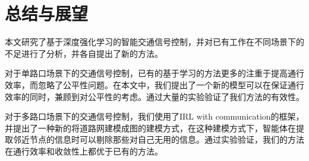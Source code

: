 \chapter{总结与展望}
本文研究了基于深度强化学习的智能交通信号控制，并对已有工作在不同场景下的不足进行了分析，并各自提出了新的方法。

对于单路口场景下的交通信号控制，已有的基于学习的方法更多的注重于提高通行效率，而忽略了公平性问题。在本文中，我们提出了一个新的模型可以在保证通行效率的同时，兼顾到对公平性的考虑。通过大量的实验验证了我们方法的有效性。

对于多路口场景下的交通信号控制，我们使用了IRL with communication的框架，并提出了一种新的将道路网建模成图的建模方式，在这种建模方式下，智能体在提取邻近节点的信息时可以剔除那些对自己无用的信息。通过实验验证，我们的方法在通行效率和收敛性上都优于已有的方法。